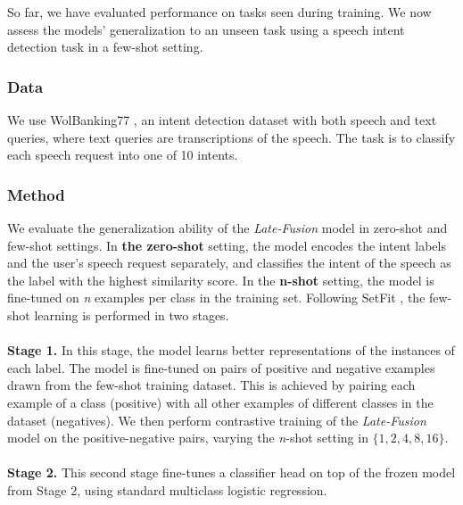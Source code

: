 \documentclass[11pt]{article}
\newcommand{\myparagraph}[1]{\noindent\textbf{#1}}
\begin{document}
So far, we have evaluated performance on tasks seen during training. We now assess the models’ generalization to an unseen task using a speech intent detection task in a few-shot setting.

\subsubsection{Data}
We use WolBanking77 \citep{wolbanking}, an intent detection dataset with both speech and text queries, where text queries are transcriptions of the speech. The task is to classify each speech request into one of 10 intents.

\subsubsection{Method}
We evaluate the generalization ability of the \textit{Late-Fusion} model in zero-shot and few-shot settings. In \textbf{the zero-shot} setting, the model encodes the intent labels and the user's speech request separately, and classifies the intent of the speech as the label with the highest similarity score. In the \textbf{n-shot} setting, the model is fine-tuned on \textit{n} examples per class in the training set. Following SetFit \citep{setfit}, the few-shot learning is performed in two stages.
\\
\\
\myparagraph{Stage 1.} In this stage, the model learns better representations of the instances of each label. The model is fine-tuned on pairs of positive and negative examples drawn from the few-shot training dataset. This is achieved by pairing each example of a class (positive) with all other examples of different classes in the dataset (negatives). We then perform contrastive training of the \textit{Late-Fusion} model on the positive-negative pairs, varying the \textit{n}-shot setting in $\{1, 2, 4, 8, 16\}$.
\\
\\
\myparagraph{Stage 2.} This second stage fine-tunes a classifier head on top of the frozen model from Stage 2, using standard multiclass logistic regression.
\end{document}
